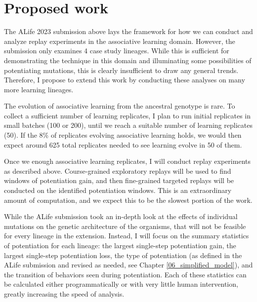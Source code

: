 \section{Proposed work}

The ALife 2023 submission above lays the framework for how we can conduct and analyze replay experiments in the associative learning domain. 
However, the submission only examines 4 case study lineages.
While this is sufficient for demonstrating the technique in this domain and illuminating some possibilities of potentiating mutations, this is clearly insufficient to draw any general trends. 
Therefore, I propose to extend this work by conducting these analyses on many more learning lineages. 

The evolution of associative learning from the ancestral genotype is rare. 
To collect a sufficient number of learning replicates, I plan to run initial replicates in small batches (100 or 200), until we reach a suitable number of learning replicates (50). 
If the 8\% of replicates evolving associative learning holds, we would then expect around 625 total replicates needed to see learning evolve in 50 of them.

Once we enough associative learning replicates, I will conduct replay experiments as described above. %
Course-grained exploratory replays will be used to find windows of potentiation gain, and then fine-grained targeted replays will be conducted on the identified potentiation windows. 
This is an extraordinary amount of computation, and we expect this to be the slowest portion of the work. 

While the ALife submission took an in-depth look at the effects of individual mutations on the genetic architecture of the organisms, that will not be feasible for every lineage in the extension. 
Instead, I will focus on the summary statistics of potentiation for each lineage: the largest single-step potentiation gain, the largest single-step potentiation loss, the type of potentiation (as defined in the ALife submission and revised as needed, see Chapter \ref{06_simplified_model}), and the transition of behaviors seen during potentiation. 
Each of these statistics can be calculated either programmatically or with very little human intervention, greatly increasing the speed of analysis. 


